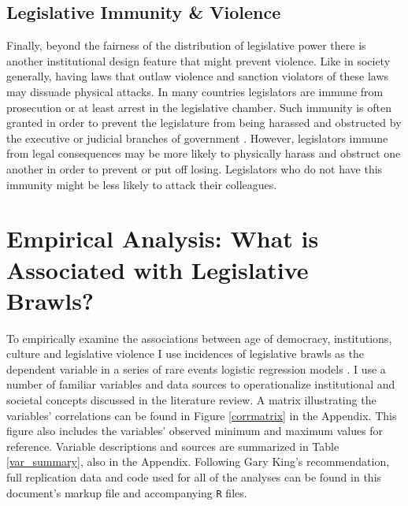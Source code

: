 \documentclass[a4paper]{article}\usepackage{graphicx, color}
\begin{document}
{\subsection{Legislative Immunity \& Violence}

Finally, beyond the fairness of the distribution of legislative power there is another institutional design feature that might prevent violence. Like in society generally, having laws that outlaw violence and sanction violators of these laws may dissuade physical attacks. In many countries legislators are immune from prosecution or at least arrest in the legislative chamber. Such immunity is often granted in order to prevent the legislature from being harassed and obstructed by the executive or judicial branches of government  \citep{Seghetti1984}. However, legislators immune from legal consequences may be more likely to physically harass and obstruct one another in order to prevent or put off losing. Legislators who do not have this immunity might be less likely to attack their colleagues.

\section{Empirical Analysis: What is Associated with Legislative Brawls?}

To empirically examine the associations between age of democracy, institutions, culture and legislative violence I use incidences of legislative brawls as the dependent variable in a series of rare events logistic regression models \citep{KingRareEvents2001, KingRareEventsPA2001}. I use a number of familiar variables and data sources to operationalize institutional and societal concepts discussed in the literature review. A matrix illustrating the variables' correlations can be found in Figure \ref{corrmatrix} in the Appendix. This figure also includes the variables' observed minimum and maximum values for reference. Variable descriptions and sources are summarized in Table \ref{var_summary}, also in the Appendix. Following Gary King's \citeyearpar{King1995} recommendation, full replication data and code used for all of the analyses can be found in this document's markup file and accompanying {\tt{R}} files.

}
\end{document}

